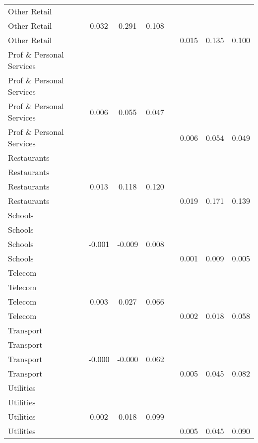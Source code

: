 \begin{table}[ht]
\begin{tabular}{lccccccc}
  Other Retail &  &  &  &  &  &  &  \\ 
  Other Retail & 0.032 & 0.291 & 0.108 &  &  &  &  \\ 
  Other Retail &  &  &  &  & 0.015 & 0.135 & 0.100 \\ 
  Prof \& Personal Services &  &  &  &  &  &  &  \\ 
  Prof \& Personal Services &  &  &  &  &  &  &  \\ 
  Prof \& Personal Services & 0.006 & 0.055 & 0.047 &  &  &  &  \\ 
  Prof \& Personal Services &  &  &  &  & 0.006 & 0.054 & 0.049 \\ 
  Restaurants &  &  &  &  &  &  &  \\ 
  Restaurants &  &  &  &  &  &  &  \\ 
  Restaurants & 0.013 & 0.118 & 0.120 &  &  &  &  \\ 
  Restaurants &  &  &  &  & 0.019 & 0.171 & 0.139 \\ 
  Schools &  &  &  &  &  &  &  \\ 
  Schools &  &  &  &  &  &  &  \\ 
  Schools & -0.001 & -0.009 & 0.008 &  &  &  &  \\ 
  Schools &  &  &  &  & 0.001 & 0.009 & 0.005 \\ 
  Telecom &  &  &  &  &  &  &  \\ 
  Telecom &  &  &  &  &  &  &  \\ 
  Telecom & 0.003 & 0.027 & 0.066 &  &  &  &  \\ 
  Telecom &  &  &  &  & 0.002 & 0.018 & 0.058 \\ 
  Transport &  &  &  &  &  &  &  \\ 
  Transport &  &  &  &  &  &  &  \\ 
  Transport & -0.000 & -0.000 & 0.062 &  &  &  &  \\ 
  Transport &  &  &  &  & 0.005 & 0.045 & 0.082 \\ 
  Utilities &  &  &  &  &  &  &  \\ 
  Utilities &  &  &  &  &  &  &  \\ 
  Utilities & 0.002 & 0.018 & 0.099 &  &  &  &  \\ 
  Utilities &  &  &  &  & 0.005 & 0.045 & 0.090 \\ 
   \bottomrule\end{tabular}
\end{table}

